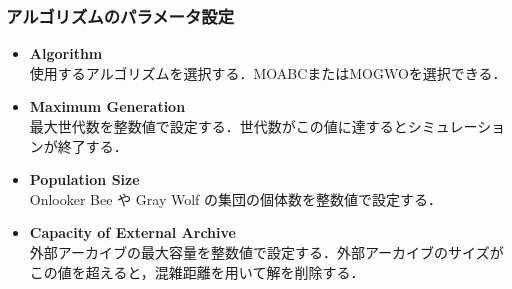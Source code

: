 \documentclass[a4paper, twocolumn]{ltjsarticle}
\begin{document}
\subsubsection{アルゴリズムのパラメータ設定}
\begin{itemize}
    \item \textbf{Algorithm}\\
        使用するアルゴリズムを選択する．MOABCまたはMOGWOを選択できる．
    \item  \textbf{Maximum Generation}\\
        最大世代数を整数値で設定する．世代数がこの値に達するとシミュレーションが終了する．
    \item \textbf{Population Size}\\
        Onlooker Bee や Gray Wolf の集団の個体数を整数値で設定する．
    \item \textbf{Capacity of External Archive}\\
        外部アーカイブの最大容量を整数値で設定する．外部アーカイブのサイズがこの値を超えると，混雑距離を用いて解を削除する．
\end{itemize}
\end{document}
